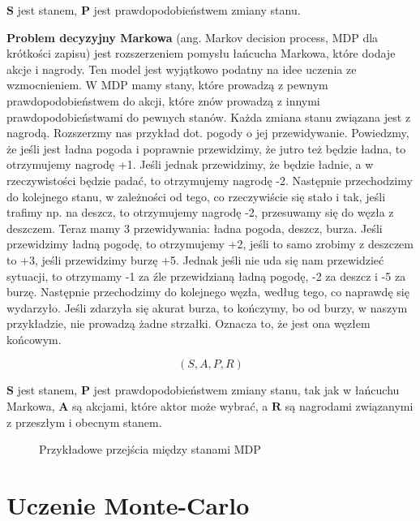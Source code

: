 \noindent $\boldsymbol{S}$ jest stanem, $\boldsymbol{P}$ jest prawdopodobieństwem zmiany stanu.\newline

\noindent \textbf{Problem decyzyjny Markowa} (ang. Markov decision process, MDP dla krótkości zapisu) jest rozszerzeniem pomysłu łańcucha Markowa, które dodaje akcje i nagrody. Ten model jest wyjątkowo podatny na idee uczenia ze wzmocnieniem. W MDP mamy stany, które prowadzą z pewnym prawdopodobieństwem do akcji, które znów prowadzą z innymi prawdopodobieństwami do pewnych stanów. Każda zmiana stanu związana jest z nagrodą. Rozszerzmy nas przykład dot. pogody o jej przewidywanie. Powiedzmy, że jeśli jest ładna pogoda i poprawnie przewidzimy, że jutro też będzie ładna, to otrzymujemy nagrodę +1. Jeśli jednak przewidzimy, że będzie ładnie, a w rzeczywistości będzie padać, to otrzymujemy nagrodę -2. Następnie przechodzimy do kolejnego stanu, w zależności od tego, co rzeczywiście się stało i tak, jeśli trafimy np. na deszcz, to otrzymujemy nagrodę -2, przesuwamy się do węzła z deszczem. Teraz mamy 3 przewidywania: ładna pogoda, deszcz, burza. Jeśli przewidzimy ładną pogodę, to otrzymujemy +2, jeśli to samo zrobimy z deszczem to +3, jeśli przewidzimy burzę +5. Jednak jeśli nie uda się nam przewidzieć sytuacji, to otrzymamy -1 za źle przewidzianą ładną pogodę, -2 za deszcz i -5 za burzę. Następnie przechodzimy do kolejnego węzła, według tego, co naprawdę się wydarzyło. Jeśli zdarzyła się akurat burza, to kończymy, bo od burzy, w naszym przykładzie, nie prowadzą żadne strzałki. Oznacza to, że jest ona węzłem końcowym.

\begin{equation}
(S, A, P, R)
\end{equation}

\noindent $\boldsymbol{S}$ jest stanem, $\boldsymbol{P}$ jest prawdopodobieństwem zmiany stanu, tak jak w łańcuchu Markowa, $\boldsymbol{A}$ są akcjami, które aktor może wybrać, a $\boldsymbol{R}$ są nagrodami związanymi z przeszłym i obecnym stanem.

\clearpage
\begin{figure}[H]
\centering

\caption{Przykładowe przejścia między stanami MDP}
\end{figure}
\clearpage

\section{Uczenie Monte-Carlo}

